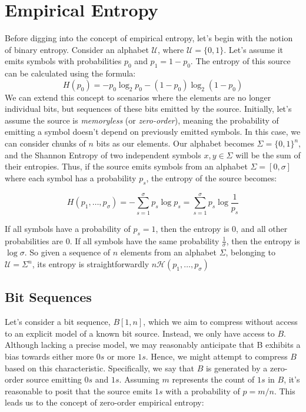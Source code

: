 
\section{Empirical Entropy}
Before digging into the concept of empirical entropy, let's begin with the notion of binary entropy. Consider an alphabet $\mathcal{U}$, where $\mathcal{U} = \{0, 1\}$. Let's assume it emits symbols with probabilities $p_0$ and $p_1 = 1 - p_0$. The entropy of this source can be calculated using the formula:
\[
H(p_0) = -p_0 \log_2 p_0 - (1 - p_0) \log_2 (1 - p_0)
\]
We can extend this concept to scenarios where the elements are no longer individual bits, but sequences of these bits emitted by the source. Initially, let's assume the source is \emph{memoryless} (or \emph{zero-order}), meaning the probability of emitting a symbol doesn't depend on previously emitted symbols. In this case, we can consider chunks of $n$ bits as our elements. Our alphabet becomes $\Sigma = \{0, 1\}^n$, and the Shannon Entropy of two independent symbols $x, y \in \Sigma$ will be the sum of their entropies. Thus, if the source emits symbols from an alphabet $\Sigma = [0,\sigma]$ where each symbol has a probability $p_s$, the entropy of the source becomes:

\[
H(p_1, \ldots, p_{\sigma}) = - \sum_{s=1}^{\sigma} p_s \log p_s = \sum_{s=1}^{\sigma} p_s \log \frac{1}{p_s}
\]

\begin{remark}
    If all symbols have a probability of $p_s =1$, then the entropy is $0$, and all other probabilities are $0$. If all symbols have the same probability $\frac{1}{\sigma}$, then the entropy is $\log \sigma$. So given a sequence of $n$ elements from an alphabet $\Sigma$, belonging to $\mathcal{U} = \Sigma^n$, its entropy is straightforwardly $n \mathcal{H}(p_1, \ldots, p_{\sigma})$
\end{remark}


\subsection{Bit Sequences}
Let's consider a bit sequence, $B[1, n]$, which we aim to compress without access to an explicit model of a known bit source. Instead, we only have access to $B$. Although lacking a precise model, we may reasonably anticipate that B exhibits a bias towards either more $0s$ or more $1s$. Hence, we might attempt to compress $B$ based on this characteristic. Specifically, we say that $B$ is generated by a zero-order source emitting $0s$ and $1s$. Assuming $m$ represents the count of $1s$ in $B$, it's reasonable to posit that the source emits $1s$ with a probability of $p = m/n$. This leads us to the concept of zero-order empirical entropy:


